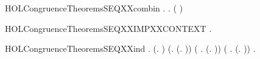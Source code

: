 \newcommand{\HOLCongruenceTheoremsSEQXXcases}{\UseVerbatim{HOLCongruenceTheoremsSEQXXcases}}
\begin{SaveVerbatim}{HOLCongruenceTheoremsSEQXXcombin}
\HOLTokenTurnstile{} \HOLSymConst{\HOLTokenForall{}}.   \HOLSymConst{\HOLTokenImp{}} \HOLSymConst{\HOLTokenForall{}}.   \HOLSymConst{\HOLTokenImp{}}  ( \HOLConst{\HOLTokenCompose} )
\end{SaveVerbatim}
\newcommand{\HOLCongruenceTheoremsSEQXXcombin}{\UseVerbatim{HOLCongruenceTheoremsSEQXXcombin}}
\begin{SaveVerbatim}{HOLCongruenceTheoremsSEQXXIMPXXCONTEXT}
\HOLTokenTurnstile{} \HOLSymConst{\HOLTokenForall{}}.   \HOLSymConst{\HOLTokenImp{}}  
\end{SaveVerbatim}
\newcommand{\HOLCongruenceTheoremsSEQXXIMPXXCONTEXT}{\UseVerbatim{HOLCongruenceTheoremsSEQXXIMPXXCONTEXT}}
\begin{SaveVerbatim}{HOLCongruenceTheoremsSEQXXind}
\HOLTokenTurnstile{} \HOLSymConst{\HOLTokenForall{}}.
        (\HOLTokenLambda{}. ) \HOLSymConst{\HOLTokenConj{}} (\HOLSymConst{\HOLTokenForall{}}.  (\HOLTokenLambda{}. )) \HOLSymConst{\HOLTokenConj{}}
       (\HOLSymConst{\HOLTokenForall{}} .   \HOLSymConst{\HOLTokenImp{}}  (\HOLTokenLambda{}.  )) \HOLSymConst{\HOLTokenConj{}}
       (\HOLSymConst{\HOLTokenForall{}} .   \HOLSymConst{\HOLTokenConj{}}   \HOLSymConst{\HOLTokenImp{}}  (\HOLTokenLambda{}.   \HOLSymConst{\ensuremath{+}}  )) \HOLSymConst{\HOLTokenImp{}}
       \HOLSymConst{\HOLTokenForall{}}.   \HOLSymConst{\HOLTokenImp{}}  
\end{SaveVerbatim}
